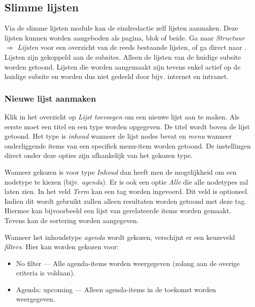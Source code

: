 \subsection{Slimme lijsten}\label{slimmelijsten}

Via de slimme lijsten module kan de eindredactie zelf lijsten aanmaken. Deze lijsten kunnen worden aangeboden als pagina, blok of beide.
Ga naar \emph{Structuur} $\Rightarrow$ \emph{Lijsten} voor een overzicht van de reeds bestaande lijsten, of ga direct naar .
Lijsten zijn gekoppeld aan de subsites. Alleen de lijsten van de huidige subsite worden getoond. Lijsten die worden aangemaakt zijn tevens enkel actief op de huidige subsite en worden dus niet gedeeld door bijv. internet en intranet.

\subsubsection{Nieuwe lijst aanmaken}

Klik in het overzicht op \emph{Lijst toevoegen} om een nieuwe lijst aan te maken. Als eerste moet een titel en een type worden opgegeven. De titel wordt boven de lijst getoond. Het type is \emph{inhoud} wanneer de lijst nodes bevat en \emph{menu} wanneer onderliggende items van een specifiek menu-item worden getoond. De instellingen direct onder deze opties zijn afhankelijk van het gekozen type.

Wanneer gekozen is voor type \emph{Inhoud} dan heeft men de mogelijkheid om een nodetype te kiezen (bijv. \emph{agenda}). Er is ook een optie \emph{Alle} die alle nodetypes zal laten zien.
In het veld \emph{Term} kan een tag worden ingevoerd. Dit veld is optioneel. Indien dit wordt gebruikt zullen alleen resultaten worden getoond met deze tag. Hiermee kan bijvoorbeeld een lijst van gerelateerde items worden gemaakt. Tevens kan de sortering worden aangegeven.

Wanneer het inhoudstype \emph{agenda} wordt gekozen, verschijnt er een keuzeveld \emph{filters}. Hier kan worden gekozen voor:

\begin{itemize}
	\item No filter --- Alle agenda-items worden weergegeven (zolang aan de overige criteria is voldaan).
	\item Agenda: upcoming --- Alleen agenda-items in de toekomst worden weergegeven.
\end{itemize}

